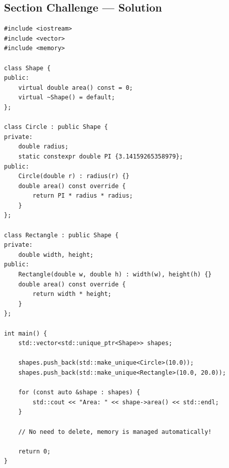 \subsection{Section Challenge --- Solution}
\begin{lstlisting}
#include <iostream>
#include <vector>
#include <memory>

class Shape {
public:
	virtual double area() const = 0;
	virtual ~Shape() = default;
};

class Circle : public Shape {
private:
	double radius;
	static constexpr double PI {3.14159265358979};
public:
	Circle(double r) : radius(r) {}
	double area() const override {
		return PI * radius * radius;
	}
};

class Rectangle : public Shape {
private:
	double width, height;
public:
	Rectangle(double w, double h) : width(w), height(h) {}
	double area() const override {
		return width * height;
	}
};

int main() {
	std::vector<std::unique_ptr<Shape>> shapes;

	shapes.push_back(std::make_unique<Circle>(10.0));
	shapes.push_back(std::make_unique<Rectangle>(10.0, 20.0));

	for (const auto &shape : shapes) {
		std::cout << "Area: " << shape->area() << std::endl;
	}

	// No need to delete, memory is managed automatically!

	return 0;
}
\end{lstlisting}

